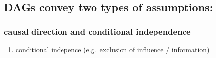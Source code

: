 \documentclass[
  letterpaper,
  DIV=11,
  numbers=noendperiod]{scrartcl}
\providecommand{\tightlist}{%
  \setlength{\itemsep}{0pt}\setlength{\parskip}{0pt}}\usepackage{longtable,booktabs,array}
\begin{document}
\subsection{DAGs convey two types of
assumptions:}\label{dags-convey-two-types-of-assumptions-1}

\subsubsection{causal direction and conditional
independence}\label{causal-direction-and-conditional-independence-1}

\begin{enumerate}
\def\labelenumi{\arabic{enumi}.}
\tightlist
\item
  conditional indepence (e.g.~exclusion of influence / information)
\end{enumerate}
\end{document}
